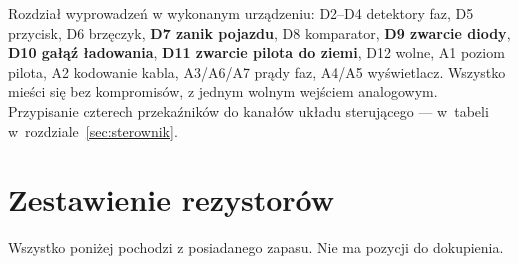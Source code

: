 \documentclass[a4paper,11pt]{article}
\begin{document}
Rozdział wyprowadzeń w wykonanym urządzeniu: D2--D4 detektory faz, D5 przycisk,
D6 brzęczyk, \textbf{D7 zanik pojazdu}, D8 komparator, \textbf{D9 zwarcie diody},
\textbf{D10 gałąź ładowania}, \textbf{D11 zwarcie pilota do ziemi}, D12 wolne,
A1 poziom pilota, A2 kodowanie kabla, A3/A6/A7 prądy faz, A4/A5 wyświetlacz.
Wszystko mieści się bez kompromisów, z jednym wolnym wejściem analogowym.
Przypisanie czterech przekaźników do kanałów układu sterującego --- w~tabeli
w~rozdziale~\ref{sec:sterownik}.

\section{Zestawienie rezystorów}
\label{sec:zestawienie}

Wszystko poniżej pochodzi z posiadanego zapasu. Nie ma pozycji do dokupienia.
\end{document}
